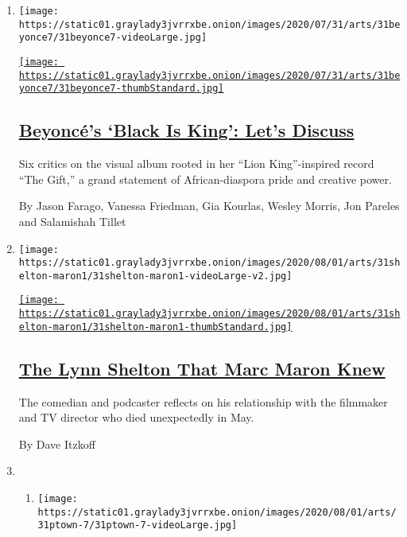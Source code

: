 \begin{enumerate}
\def\labelenumi{\arabic{enumi}.}
\item
  \texttt{[image: https://static01.graylady3jvrrxbe.onion/images/2020/07/31/arts/31beyonce7/31beyonce7-videoLarge.jpg]}

  \href{/2020/07/31/arts/music/beyonce-black-is-king.html}{\texttt{[image: https://static01.graylady3jvrrxbe.onion/images/2020/07/31/arts/31beyonce7/31beyonce7-thumbStandard.jpg]}}

  \hypertarget{beyoncuxe9s-black-is-king-lets-discuss}{%
  \subsection{\texorpdfstring{\href{/2020/07/31/arts/music/beyonce-black-is-king.html}{Beyoncé's
  `Black Is King': Let's
  Discuss}}{Beyoncé's `Black Is King': Let's Discuss}}\label{beyoncuxe9s-black-is-king-lets-discuss}}

  Six critics on the visual album rooted in her ``Lion King''-inspired
  record ``The Gift,'' a grand statement of African-diaspora pride and
  creative power.

  By Jason Farago, Vanessa Friedman, Gia Kourlas, Wesley Morris, Jon
  Pareles and Salamishah Tillet
\item
  \texttt{[image: https://static01.graylady3jvrrxbe.onion/images/2020/08/01/arts/31shelton-maron1/31shelton-maron1-videoLarge-v2.jpg]}

  \href{/2020/07/31/movies/marc-maron-lynn-shelton.html}{\texttt{[image: https://static01.graylady3jvrrxbe.onion/images/2020/08/01/arts/31shelton-maron1/31shelton-maron1-thumbStandard.jpg]}}

  \hypertarget{the-lynn-shelton-that-marc-maron-knew}{%
  \subsection{\texorpdfstring{\href{/2020/07/31/movies/marc-maron-lynn-shelton.html}{The
  Lynn Shelton That Marc Maron
  Knew}}{The Lynn Shelton That Marc Maron Knew}}\label{the-lynn-shelton-that-marc-maron-knew}}

  The comedian and podcaster reflects on his relationship with the
  filmmaker and TV director who died unexpectedly in May.

  By Dave Itzkoff
\item
  \begin{enumerate}
  \def\labelenumii{\arabic{enumii}.}
  \item
    \texttt{[image: https://static01.graylady3jvrrxbe.onion/images/2020/08/01/arts/31ptown-7/31ptown-7-videoLarge.jpg]}


\end{enumerate}
\end{enumerate}
